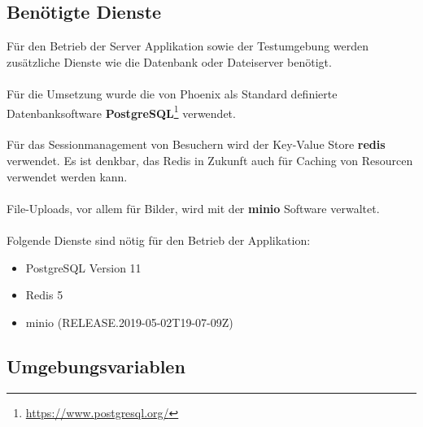 \clearpage
\subsection{Benötigte Dienste}

Für den Betrieb der Server Applikation sowie der Testumgebung werden
zusätzliche Dienste wie die Datenbank oder Dateiserver benötigt.\\
\\
Für die Umsetzung wurde die von Phoenix als Standard definierte
Datenbanksoftware \textbf{PostgreSQL}\footnote{\url{https://www.postgresql.org/}} verwendet.\\
\\
Für das Sessionmanagement von Besuchern wird der Key-Value Store \textbf{redis}
verwendet. Es ist denkbar, das Redis in Zukunft auch für Caching von Resourcen
verwendet werden kann.\\
\\
File-Uploads, vor allem für Bilder, wird mit der \textbf{minio} Software
verwaltet.\\
\\
\noindent{}Folgende Dienste sind nötig für den Betrieb der Applikation:

\begin{itemize}
	\tightlist{}
	\item{} PostgreSQL Version 11
	\item{} Redis 5
	\item{} minio (RELEASE.2019-05-02T19-07-09Z)
\end{itemize}

\clearpage
\subsection{Umgebungsvariablen}

